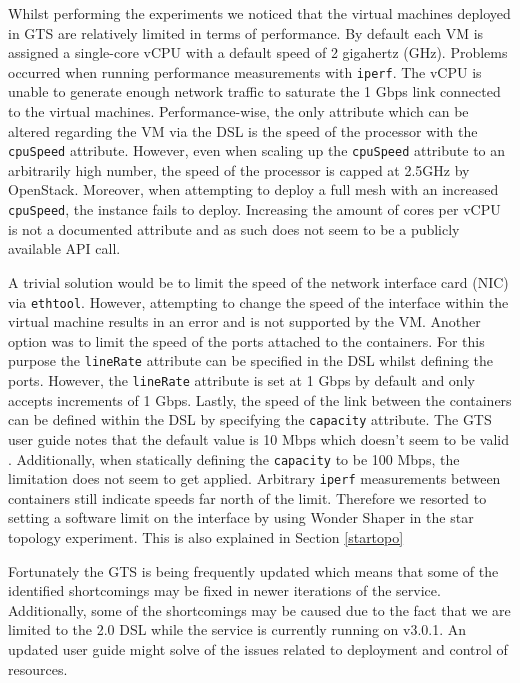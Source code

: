 Whilst performing the experiments we noticed that the virtual machines deployed in GTS are relatively limited in terms of performance. By default each VM is assigned a single-core vCPU with a default speed of 2 gigahertz (GHz). Problems occurred when running performance measurements with \texttt{iperf}. The vCPU is unable to generate enough network traffic to saturate the 1 Gbps link connected to the virtual machines. Performance-wise, the only attribute which can be altered regarding the VM via the DSL is the speed of the processor with the \texttt{cpuSpeed} attribute. However, even when scaling up the \texttt{cpuSpeed} attribute to an arbitrarily high number, the speed of the processor is capped at 2.5GHz by OpenStack. Moreover, when attempting to deploy a full mesh with an increased \texttt{cpuSpeed}, the instance fails to deploy. Increasing the amount of cores per vCPU is not a documented attribute and as such does not seem to be a publicly available API call.

A trivial solution would be to limit the speed of the network interface card (NIC) via \texttt{ethtool}. However, attempting to change the speed of the interface within the virtual machine results in an error and is not supported by the VM. Another option was to limit the speed of the ports attached to the containers. For this purpose the \texttt{lineRate} attribute can be specified in the DSL whilst defining the ports. However, the \texttt{lineRate} attribute is set at 1 Gbps by default and only accepts increments of 1 Gbps. Lastly, the speed of the link between the containers can be defined within the DSL by specifying the \texttt{capacity} attribute. The GTS user guide notes that the default value is 10 Mbps which doesn't seem to be valid \cite{userguide}. Additionally, when statically defining the \texttt{capacity} to be 100 Mbps, the limitation does not seem to get applied. Arbitrary \texttt{iperf} measurements between containers still indicate speeds far north of the limit. Therefore we resorted to setting a software limit on the interface by using Wonder Shaper in the star topology experiment. This is also explained in Section \ref{startopo}

Fortunately the GTS is being frequently updated which means that some of the identified shortcomings may be fixed in newer iterations of the service. Additionally, some of the shortcomings may be caused due to the fact that we are limited to the 2.0 DSL while the service is currently running on v3.0.1. An updated user guide might solve of the issues related to deployment and control of resources. 

